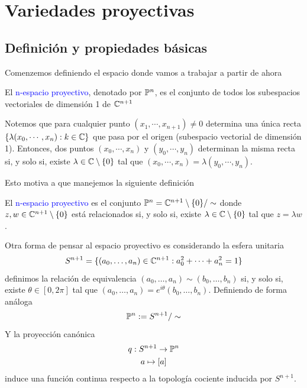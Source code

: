 \section{Variedades proyectivas}

\subsection{Definición y propiedades básicas}

    Comenzemos definiendo el espacio donde vamos a trabajar a partir de ahora
    \begin{definition}
        El \textcolor{blue}{n-espacio proyectivo}, denotado por $\mathbb{P}^n$, es el conjunto de todos los subespacios vectoriales de dimensión 1 de $\mathbb{C}^{n+1}$
    \end{definition}

    \begin{remark}
        Notemos que para cualquier punto $(x_1,\cdots,x_{n+1})\neq 0$ determina una única recta $\{\lambda(x_0,\cdots,x_{n}):k\in\mathbb{C}\}$ que pasa por el origen (subespacio vectorial de dimensión 1). Entonces, dos puntos $(x_0,\cdots,x_n)$ y $(y_0,\cdots,y_n)$ determinan la misma recta si, y solo si, existe $\lambda\in\mathbb{C}\setminus\{0\}$ tal que  $(x_0,\cdots,x_n)=\lambda(y_0,\cdots,y_n)$.
    \end{remark}
    
    Esto motiva a que manejemos la siguiente definición
    \begin{definition}
        El \textcolor{blue}{n-espacio proyectivo} es el conjunto $\mathbb{P}^n=\mathbb{C}^{n+1}\setminus\{0\}/\sim$ donde $z,w\in\mathbb{C}^{n+1}\setminus\{0\}$ está relacionados si, y solo si, existe $\lambda\in\mathbb{C}\setminus\{0\}$ tal que  $z=\lambda w$.
    \end{definition}

    \begin{remark}\label{esferaproyectivo}
        Otra forma de pensar al espacio proyectivo es considerando la esfera unitaria 
        $$S^{n+1}=\{(a_0,\dots,a_n)\in\mathbb{C}^{n+1}:a_0^2+\cdots+a_n^2=1\}$$
        definimos la relación de equivalencia $(a_0,\dots,a_n)\sim (b_0,\dots,b_n)$ si, y solo si, existe $\theta\in[0,2\pi]$ tal que $(a_0,\dots,a_n)=e^{i\theta}(b_0,\dots,b_n)$. Definiendo de forma análoga
        \begin{equation*}
            \mathbb{P}^n:=S^{n+1}/\sim
        \end{equation*}
        Y la proyección canónica
        \begin{gather*}
            q:S^{n+1}\to \mathbb{P}^n\\
            a\mapsto [a]
        \end{gather*}
        induce una función continua respecto a la topología cociente inducida por $S^{n+1}$.
    \end{remark}
    
